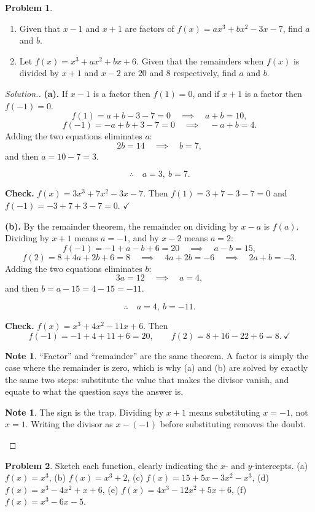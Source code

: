 \documentclass[11pt,a4paper]{article}
\theoremstyle{definition}
\newtheorem{note}[thm]{Note}
\newtheorem{problemx}{Problem}[section]
\newenvironment{problem}{\begin{problemx}}{\end{problemx}}
\newenvironment{solution}
  {\renewcommand{\qedsymbol}{}\begin{proof}[\textit{Solution}.]}
  {\end{proof}}
\let\amscheckmark\checkmark
\renewcommand{\checkmark}{\ensuremath{\amscheckmark}}
\begin{document}
\begin{problem}
\begin{enumerate}
\item[(a).] Given that $x-1$ and $x+1$ are factors of $f(x)=ax^3+bx^2-3x-7$, find $a$
and $b$.
\item[(b).] Let $f(x)=x^3+ax^2+bx+6$. Given that the remainders when $f(x)$ is divided
by $x+1$ and $x-2$ are $20$ and $8$ respectively, find $a$ and $b$.
\end{enumerate}
\end{problem}

\begin{solution}
\textbf{(a).} If $x-1$ is a factor then $f(1)=0$, and if $x+1$ is a factor then
$f(-1)=0$.
$$f(1)=a+b-3-7=0\quad\implies\quad a+b=10,$$
$$f(-1)=-a+b+3-7=0\quad\implies\quad -a+b=4.$$
Adding the two equations eliminates $a$:
$$2b=14\quad\implies\quad b=7,$$
and then $a=10-7=3$.

$$\therefore\quad a=3,\ b=7.$$

\textbf{Check.} $f(x)=3x^3+7x^2-3x-7$. Then $f(1)=3+7-3-7=0$ and
$f(-1)=-3+7+3-7=0$. $\checkmark$

\textbf{(b).} By the remainder theorem, the remainder on dividing by $x-a$ is $f(a)$.
Dividing by $x+1$ means $a=-1$, and by $x-2$ means $a=2$:
$$f(-1)=-1+a-b+6=20\quad\implies\quad a-b=15,$$
$$f(2)=8+4a+2b+6=8\quad\implies\quad 4a+2b=-6\quad\implies\quad 2a+b=-3.$$
Adding the two equations eliminates $b$:
$$3a=12\quad\implies\quad a=4,$$
and then $b=a-15=4-15=-11$.

$$\therefore\quad a=4,\ b=-11.$$

\textbf{Check.} $f(x)=x^3+4x^2-11x+6$. Then
$$f(-1)=-1+4+11+6=20,\qquad f(2)=8+16-22+6=8.\ \checkmark$$

\begin{note}
``Factor'' and ``remainder'' are the same theorem. A factor is simply the case where
the remainder is zero, which is why (a) and (b) are solved by exactly the same two
steps: substitute the value that makes the divisor vanish, and equate to what the
question says the answer is.
\end{note}

\begin{note}
The sign is the trap. Dividing by $x+1$ means substituting $x=-1$, not $x=1$. Writing
the divisor as $x-(-1)$ before substituting removes the doubt.
\end{note}
\end{solution}

\begin{problem}
Sketch each function, clearly indicating the $x$- and $y$-intercepts.
\quad (a) $f(x)=x^3$, \quad (b) $f(x)=x^3+2$, \quad (c) $f(x)=15+5x-3x^2-x^3$, \quad
(d) $f(x)=x^3-4x^2+x+6$, \quad (e) $f(x)=4x^3-12x^2+5x+6$, \quad
(f) $f(x)=x^3-6x-5$.
\end{problem}
\end{document}
